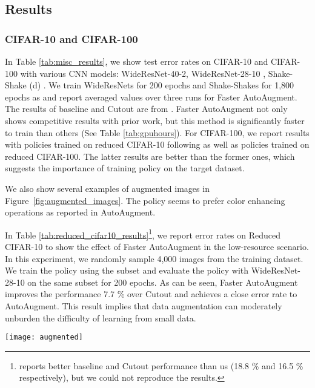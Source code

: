 \documentclass[10pt,twocolumn,letterpaper]{article}
\def\Figref#1{Figure~\ref{#1}}
\newcommand{\Tabref}[1]{Table \ref{#1}}
\newcommand{\autoaugment}{AutoAugment\xspace}
\newcommand{\faster}{Faster \autoaugment}
\begin{document}
\subsection{Results}\label{sub:qualititative_results}

\subsubsection*{CIFAR-10 and CIFAR-100}

In \Tabref{tab:misc_results}, we show test error rates on CIFAR-10 and CIFAR-100 with various CNN models: WideResNet-40-2, WideResNet-28-10 \cite{Zagoruyko}, Shake-Shake (d) \cite{Gastaldi}. We train WideResNets for 200 epochs and Shake-Shakes for 1,800 epochs as \cite{Cubuk2018} and report averaged values over three runs for \faster. The results of baseline and Cutout are from \cite{Cubuk2018,Lim2019}.  \faster not only shows competitive results with prior work, but this method is significantly faster to train than others (See \Tabref{tab:gpuhours}). For CIFAR-100, we report results with policies trained on reduced CIFAR-10 following \cite{Cubuk2018} as well as policies trained on reduced CIFAR-100. The latter results are better than the former ones, which suggests the importance of training policy on the target dataset.

We also show several examples of augmented images in \Figref{fig:augmented_images}. The policy seems to prefer color enhancing operations as reported in \autoaugment \cite{Cubuk2018}.

In \Tabref{tab:reduced_cifar10_results}\footnote{\cite{Cubuk2018} reports better baseline and Cutout performance than us  (18.8 \% and 16.5 \% respectively), but we could not reproduce the results.}, we report error rates on Reduced CIFAR-10 to show the effect of \faster in the low-resource scenario. In this experiment, we randomly sample 4,000 images from the training dataset. We train the policy using the subset and evaluate the policy with WideResNet-28-10 on the same subset for 200 epochs. As can be seen, \faster improves the performance 7.7 \% over Cutout and achieves a close error rate to \autoaugment. This result implies that data augmentation can moderately unburden the difficulty of learning from small data.


\begin{figure*}
    \centering
    \texttt{[image: augmented]}
    \caption{Original and augmented images of CIFAR-10 (upper) and SVHN (lower). As can been seen, \faster can transform original images into diverse augmented images with sub-policies at the right-hand side.}
    \label{fig:augmented_images}
\end{figure*}
\end{document}

